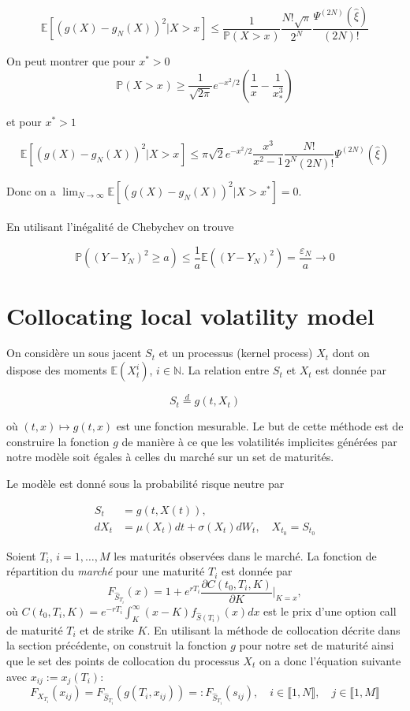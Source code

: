 \documentclass[a4paper,12pt]{report}
\numberwithin{equation}{section}
\theoremstyle{definition}
\numberwithin{equation}{section}
\begin{document}
$$\mathbb{E}\left[(g(X)-g_{N}(X))^{2}|X>x^{}\right]\leq\frac{1}{\mathbb{P}(X>x^{})}\frac{N!\sqrt{\pi}}{2^{N}}\frac{\Psi^{(2N)}(\hat{\xi})}{(2N)!}$$

On peut montrer que pour $x^{*}>0$ $$\mathbb{P}(X>x^{})\geq\frac{1}{\sqrt{2\pi}}e^{-x_{}^{2}/2}\left(\frac{1}{x^{}}-\frac{1}{x_{*}^{3}}\right)$$

et pour $x^{*}>1$

$$\mathbb{E}\left[(g(X)-g_{N}(X))^{2}|X>x^{}\right]\leq\pi\sqrt{2}e^{-x_{}^{2}/2}\frac{x_{}^{3}}{x_{}^{2}-1}\frac{N!}{2^{N}(2N)!}\Psi^{(2N)}(\hat{\xi})$$

Donc on a $\lim_{N\to\infty}\mathbb{E}\left[(g(X)-g_{N}(X))^{2}|X>x^{*}\right]=0$.
\\\\
En utilisant l'inégalité de Chebychev on trouve

$$\mathbb{P}((Y-Y_{N})^{2}\geq a)\leq\frac{1}{a}\mathbb{E}((Y-Y_{N})^{2})=\frac{\varepsilon_{N}}{a}\to0$$
\section{Collocating local volatility model}
\label{colloc}
On considère un sous jacent $S_t$ et un processus (kernel process) $X_t$ dont on dispose des moments $\mathbb{E}(X^{i}_t)$, $i\in\mathbb{N}$. La relation entre $S_t$ et $X_t$ est donnée par

$$S_t\overset{d}{=}g(t,X_t)$$

où $(t,x)\mapsto g(t,x)$ est une fonction mesurable. Le but de cette méthode est de construire la fonction $g$ de manière à ce que les volatilités implicites générées par notre modèle soit égales à celles du marché sur un set de maturités.

Le modèle est donné sous la probabilité risque neutre par

\begin{equation}
\label{clveq}
\begin{split}
 S_t&=g(t,X(t)),\\
 dX_t&=\mu(X_t)dt+\sigma(X_t)dW_t,\quad X_{t_{0}}=S_{t_{0}} 
 \end{split}
 \end{equation}

Soient $T_{i}$, $i=1,\dots,M$ les maturités observées dans le marché. La fonction de répartition du \textit{marché} pour une maturité $T_{i}$ est donnée par $$F_{\hat{S}_{T_{i}}}(x)=1+e^{rT_{i}}\frac{\partial C(t_{0},T_{i},K)}{\partial K}\bigg|_{K=x},$$ où $C(t_{0},T_{i},K)=e^{-rT_{i}}\displaystyle \int_{K}^{\infty}(x-K)f_{\hat{S}(T_{i})}(x)dx$ est le prix d'une option call de maturité $T_{i}$ et de strike $K$. En utilisant la méthode de collocation décrite dans la section précédente, on construit la fonction $g$ pour notre set de maturité ainsi que le set des points de collocation du processus $X_t$ on a donc l'équation suivante avec $x_{ij}:=x_{j}(T_{i})$:$$F_{X_{T_{i}}}(x_{ij})=F_{\hat{S}_{T_{i}}}(g(T_{i},x_{ij}))=:F_{\hat{S}_{T_{i}}}(s_{ij}),\quad i\in\llbracket1,N\rrbracket,\quad j\in\llbracket1,M\rrbracket$$
\end{document}
